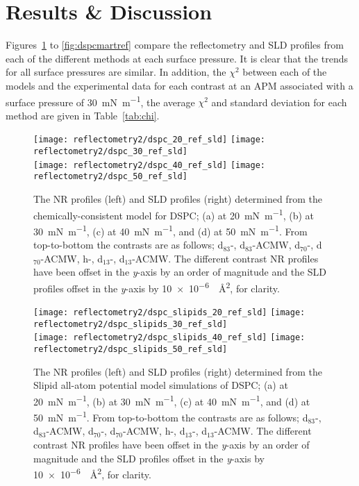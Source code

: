 \section{Results \& Discussion}
Figures~\ref{fig:dspcccref} to \ref{fig:dspcmartref} compare the reflectometry and SLD profiles from each of the different methods at each surface pressure.
It is clear that the trends for all surface pressures are similar.
In addition, the $\chi^2$ between each of the models and the experimental data for each contrast at an APM associated with a surface pressure of \SI{30}{\milli\newton\per\meter}, the average $\chi^2$ and standard deviation for each method are given in Table~\ref{tab:chi}.
%
\begin{figure}
    \centering
    \texttt{[image: reflectometry2/dspc\_20\_ref\_sld]}
    \texttt{[image: reflectometry2/dspc\_30\_ref\_sld]}\\
    \texttt{[image: reflectometry2/dspc\_40\_ref\_sld]}
    \texttt{[image: reflectometry2/dspc\_50\_ref\_sld]}
    \caption{The NR profiles (left) and SLD profiles (right) determined from the chemically-consistent model for DSPC; (a) at \SI{20}{\milli\newton\per\meter}, (b) at \SI{30}{\milli\newton\per\meter}, (c) at \SI{40}{\milli\newton\per\meter}, and (d) at \SI{50}{\milli\newton\per\meter}. From top-to-bottom the contrasts are as follows; d${_83}$-, d${_83}$-ACMW, d${_70}$-, d${_70}$-ACMW, h-, d${_13}$-, d${_13}$-ACMW. The different contrast NR profiles have been offset in the \emph{y}-axis by an order of magnitude and the SLD profiles offset in the \emph{y}-axis by \SI{10e-6}{\per\angstrom\squared}, for clarity.}
    \label{fig:dspcccref}
\end{figure}
%
%
\begin{figure}
    \centering
    \texttt{[image: reflectometry2/dspc\_slipids\_20\_ref\_sld]}
    \texttt{[image: reflectometry2/dspc\_slipids\_30\_ref\_sld]}\\
    \texttt{[image: reflectometry2/dspc\_slipids\_40\_ref\_sld]}
    \texttt{[image: reflectometry2/dspc\_slipids\_50\_ref\_sld]}
    \caption{The NR profiles (left) and SLD profiles (right) determined from the Slipid all-atom potential model simulations of DSPC; (a) at \SI{20}{\milli\newton\per\meter}, (b) at \SI{30}{\milli\newton\per\meter}, (c) at \SI{40}{\milli\newton\per\meter}, and (d) at \SI{50}{\milli\newton\per\meter}. From top-to-bottom the contrasts are as follows; d${_83}$-, d${_83}$-ACMW, d${_70}$-, d${_70}$-ACMW, h-, d${_13}$-, d${_13}$-ACMW. The different contrast NR profiles have been offset in the \emph{y}-axis by an order of magnitude and the SLD profiles offset in the \emph{y}-axis by \SI{10e-6}{\per\angstrom\squared}, for clarity.}
    \label{fig:dspcsliref}
\end{figure}
